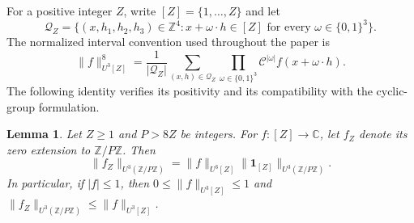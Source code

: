 \documentclass[twoside]{aomart}
\theoremstyle{paperplain}
\newtheorem{lemma}[theorem]{Lemma}
\theoremstyle{paperdefinition}
\newcommand{\Z}{\mathbb Z}
\newcommand{\C}{\mathbb C}
\numberwithin{equation}{section}
\begin{document}
For a positive integer $Z$, write $[Z]=\{1,\ldots,Z\}$ and let
\begin{equation*}
 \mathcal Q_Z=
 \{(x,h_1,h_2,h_3)\in\Z^4:
                   x+\omega\cdot h\in[Z]\text{ for every }
                   \omega\in\{0,1\}^3\}.
\end{equation*}
The normalized interval convention used throughout the paper is
\begin{equation}
 \|f\|_{U^3[Z]}^8
 =\frac1{|\mathcal Q_Z|}
   \sum_{(x,h)\in\mathcal Q_Z}
       \prod_{\omega\in\{0,1\}^3}
          \mathcal C^{|\omega|}f(x+\omega\cdot h).
 \label{tr:interval-norm}
\end{equation}
The following identity verifies its positivity and its compatibility
with the cyclic-group formulation.

\begin{lemma}\label{tr:interval-embedding}
Let $Z\ge1$ and $P>8Z$ be integers. For $f:[Z]\to\C$, let
$f_Z$ denote its zero extension to $\Z/P\Z$. Then
\begin{equation}
 \|f_Z\|_{U^3(\Z/P\Z)}
 =\|f\|_{U^3[Z]}
        \|\mathbf1_{[Z]}\|_{U^3(\Z/P\Z)}.
 \label{tr:embedding-identity}
\end{equation}
In particular, if $|f|\le1$, then
$0\le\|f\|_{U^3[Z]}\le1$ and
$\|f_Z\|_{U^3(\Z/P\Z)}\le\|f\|_{U^3[Z]}$.
\end{lemma}
\end{document}
